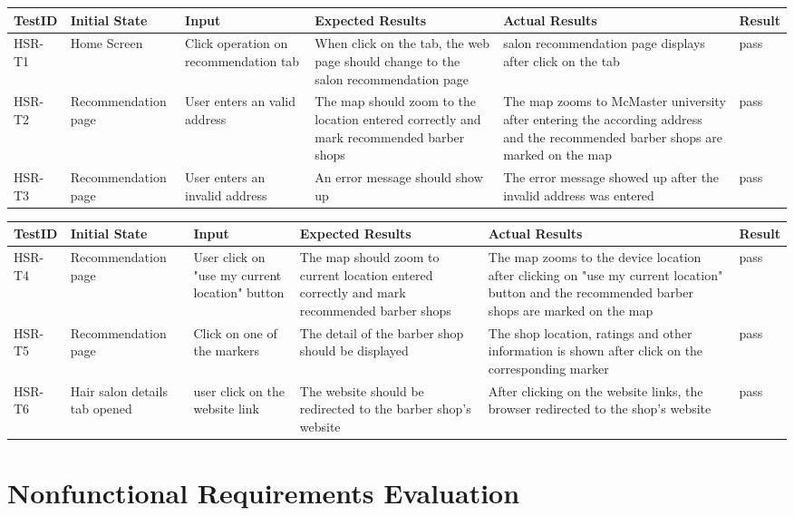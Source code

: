 \documentclass[12pt, oneside, openany, titlepage]{article}
\begin{document}
\begin{tabular}{ |p{2cm}| p{3cm}| p{3cm}| p{3cm}|p{2cm}| p{1cm}|} 
 \hline
 TestID & Initial State & Input & Expected Results & Actual Results & Result \\ 
\hline
HSR-T1 & Home Screen & Click operation on recommendation tab & When click on the tab, the web page should change to the salon recommendation page & salon recommendation page displays after click on the tab & pass\\
 \hline
HSR-T2 & Recommendation page & User enters an valid address & The map should zoom to the location entered correctly and mark recommended barber shops & The map zooms to McMaster university after entering the according address and the recommended barber shops are marked on the map & pass\\
 \hline
 HSR-T3 & Recommendation page & User enters an invalid address & An error message should show up & The error message showed up after the invalid address was entered & pass\\
 \hline
\end{tabular}

\begin{tabular}{ |p{2cm}| p{3cm}| p{3cm}| p{3cm}|p{2cm}| p{1cm}|} 
 \hline
 TestID & Initial State & Input & Expected Results & Actual Results & Result \\ 
\hline
HSR-T4 & Recommendation page & User click on "use my current location" button & The map should zoom to current location entered correctly and mark recommended barber shops & The map zooms to the device location after clicking on "use my current location" button and the recommended barber shops are marked on the map & pass\\
 \hline
HSR-T5 & Recommendation page & Click on one of the markers & The detail of the barber shop should be displayed & The shop location, ratings and other information is shown after click on the corresponding marker & pass\\
 \hline
 HSR-T6 & Hair salon details tab opened & user click on the website link & The website should be redirected to the barber shop's website & After clicking on the website links, the browser redirected to the shop's website & pass\\
 \hline
\end{tabular}
\section{Nonfunctional Requirements Evaluation}
\end{document}
